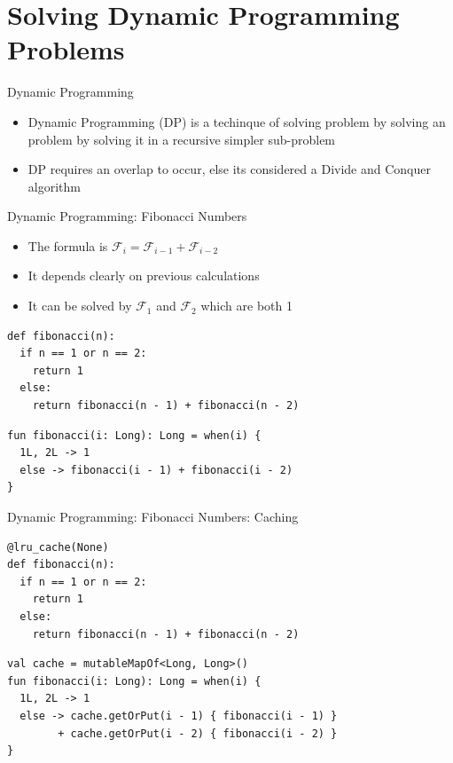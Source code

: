 \documentclass[11pt,pdf, aspectratio=169]{beamer}
\begin{document}
  \section{Solving Dynamic Programming Problems}
  \begin{frame}{Dynamic Programming}
    \begin{itemize}
      \item Dynamic Programming (DP) is a techinque of solving problem by solving an problem by solving it in a recursive simpler sub-problem
      \item DP requires an overlap to occur, else its considered a Divide and Conquer algorithm
    \end{itemize}
  \end{frame}
  \begin{frame}[containsverbatim]{Dynamic Programming: Fibonacci Numbers}
    \begin{itemize}
      \item The formula is $\mathcal{F}_i = \mathcal{F}_{i-1} + \mathcal{F}_{i-2}$
      \item It depends clearly on previous calculations
      \item It can be solved by $\mathcal{F}_1$ and $\mathcal{F}_2$ which are both 1
    \end{itemize}
    \begin{verbatim}
def fibonacci(n):
  if n == 1 or n == 2:
    return 1
  else:
    return fibonacci(n - 1) + fibonacci(n - 2)
    \end{verbatim}
    \begin{verbatim}
fun fibonacci(i: Long): Long = when(i) {
  1L, 2L -> 1
  else -> fibonacci(i - 1) + fibonacci(i - 2)
}
    \end{verbatim}
  \end{frame}
  \begin{frame}[containsverbatim]{Dynamic Programming: Fibonacci Numbers: Caching}
    \begin{verbatim}
@lru_cache(None)
def fibonacci(n):
  if n == 1 or n == 2:
    return 1
  else:
    return fibonacci(n - 1) + fibonacci(n - 2)
    \end{verbatim}
    \begin{verbatim}
val cache = mutableMapOf<Long, Long>()
fun fibonacci(i: Long): Long = when(i) {
  1L, 2L -> 1
  else -> cache.getOrPut(i - 1) { fibonacci(i - 1) }
        + cache.getOrPut(i - 2) { fibonacci(i - 2) }
}
    \end{verbatim}
  \end{frame}
\end{document}
